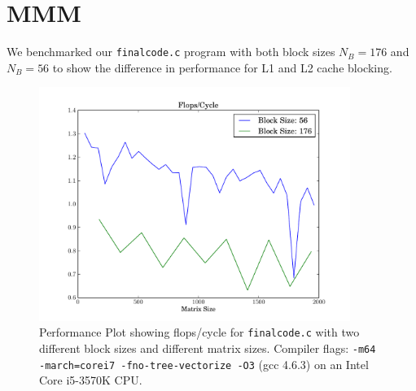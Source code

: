 \documentclass[portrait,a4paper]{article}
\begin{document}
\section{MMM}
We benchmarked our \lstinline{finalcode.c} program with both block sizes $N_B=176$ and $N_B=56$ to show the difference in performance for L1 and L2 cache blocking.
\begin{figure}[H]
    \centering
    \includegraphics[width=0.9\textwidth]{code/flops_cycle_matrix}
    \caption{Performance Plot showing flops/cycle for \lstinline{finalcode.c} with two different block sizes and different matrix sizes. Compiler flags: \texttt{-m64 -march=corei7 -fno-tree-vectorize -O3} (gcc 4.6.3) on an Intel Core i5-3570K CPU.}
    \label{fig:matrix_cycle}
\end{figure}  
\end{document}
